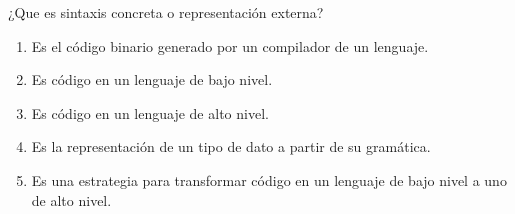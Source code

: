 {  
¿Que es sintaxis concreta o representación externa?
\begin{enumerate}

\item Es el código binario generado por un compilador de un lenguaje.
\item Es código en un lenguaje de bajo nivel.
\item Es código en un lenguaje de alto nivel.
\item Es la representación de un tipo de dato a partir de su gramática.
\item Es una estrategia para transformar código en un lenguaje de bajo nivel a uno de alto nivel.
  \end{enumerate}
}
